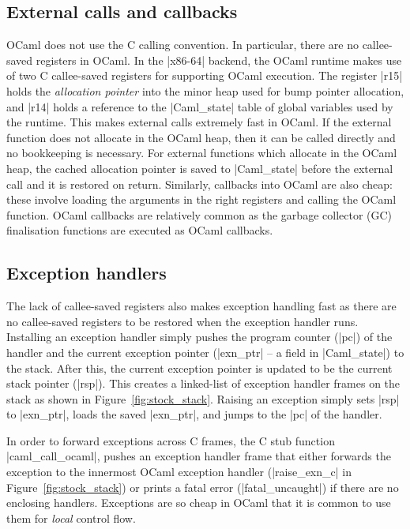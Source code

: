 \documentclass[sigplan,10pt,review,anonymous]{acmart}\settopmatter{printfolios=true,printccs=false,printacmref=false}
\begin{document}
\subsection{External calls and callbacks}
\label{sec:external}

OCaml does not use the C calling convention. In particular, there are no
callee-saved registers in OCaml. In the |x86-64| backend, the OCaml runtime
makes use of two C callee-saved registers for supporting OCaml execution. The
register |r15| holds the \emph{allocation pointer} into the minor heap used for
bump pointer allocation, and |r14| holds a reference to the |Caml_state| table
of global variables used by the runtime. This makes external calls extremely
fast in OCaml. If the external function does not allocate in the OCaml heap,
then it can be called directly and no bookkeeping is necessary. For external
functions which allocate in the OCaml heap, the cached allocation pointer is
saved to |Caml_state| before the external call and it is restored on return.
Similarly, callbacks into OCaml are also cheap: these involve loading the
arguments in the right registers and calling the OCaml function. OCaml
callbacks are relatively common as the garbage collector (GC) finalisation
functions are executed as OCaml callbacks.

\subsection{Exception handlers}
\label{sec:exn_handlers}

The lack of callee-saved registers also makes exception handling fast as there
are no callee-saved registers to be restored when the exception handler runs.
Installing an exception handler simply pushes the program counter (|pc|) of the
handler and the current exception pointer (|exn_ptr| -- a field in
|Caml_state|) to the stack. After this, the current exception pointer is
updated to be the current stack pointer (|rsp|). This creates a linked-list of
exception handler frames on the stack as shown in Figure~\ref{fig:stock_stack}.
Raising an exception simply sets |rsp| to |exn_ptr|, loads the saved |exn_ptr|,
and jumps to the |pc| of the handler.


In order to forward exceptions across C frames, the C stub function
|caml_call_ocaml|, pushes an exception handler frame that either forwards the
exception to the innermost OCaml exception handler (|raise_exn_c| in
Figure~\ref{fig:stock_stack}) or prints a fatal error (|fatal_uncaught|) if
there are no enclosing handlers. Exceptions are so cheap in OCaml that it is
common to use them for \emph{local} control flow.
\end{document}
